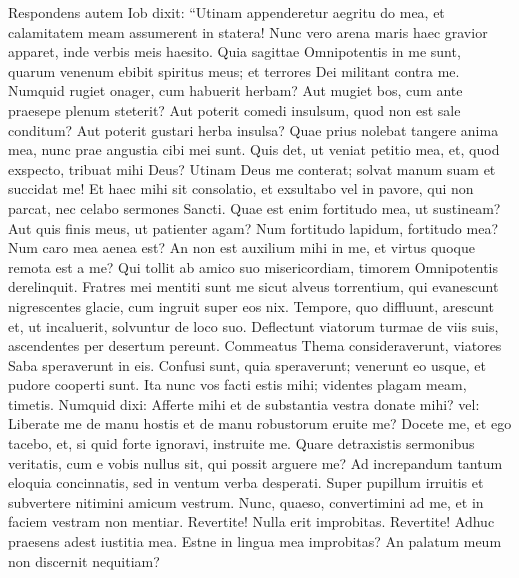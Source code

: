 \begin{biblechapter}  
\verse Respondens autem Iob dixit: 
\verse “Utinam appenderetur aegritu do mea, et calamitatem meam assumerent in statera! 
\verse Nunc vero arena maris haec gravior apparet, inde verbis meis haesito. 
\verse Quia sagittae Omnipotentis in me sunt, quarum venenum ebibit spiritus meus; et terrores Dei militant contra me. 
\verse Numquid rugiet onager, cum habuerit herbam? Aut mugiet bos, cum ante praesepe plenum steterit? 
\verse Aut poterit comedi insulsum, quod non est sale conditum? Aut poterit gustari herba insulsa? 
\verse Quae prius nolebat tangere anima mea, nunc prae angustia cibi mei sunt. 
\verse Quis det, ut veniat petitio mea, et, quod exspecto, tribuat mihi Deus? 
\verse Utinam Deus me conterat; solvat manum suam et succidat me! 
\verse Et haec mihi sit consolatio, et exsultabo vel in pavore, qui non parcat, nec celabo sermones Sancti. 
\verse Quae est enim fortitudo mea, ut sustineam? Aut quis finis meus, ut patienter agam? 
\verse Num fortitudo lapidum, fortitudo mea? Num caro mea aenea est? 
\verse An non est auxilium mihi in me, et virtus quoque remota est a me? 
\verse Qui tollit ab amico suo misericordiam, timorem Omnipotentis derelinquit. 
\verse Fratres mei mentiti sunt me sicut alveus torrentium, qui evanescunt 
\verse nigrescentes glacie, cum ingruit super eos nix. 
\verse Tempore, quo diffluunt, arescunt et, ut incaluerit, solvuntur de loco suo. 
\verse Deflectunt viatorum turmae de viis suis, ascendentes per desertum pereunt. 
\verse Commeatus Thema consideraverunt, viatores Saba speraverunt in eis. 
\verse Confusi sunt, quia speraverunt; venerunt eo usque, et pudore cooperti sunt. 
\verse Ita nunc vos facti estis mihi; videntes plagam meam, timetis. 
\verse Numquid dixi: Afferte mihi et de substantia vestra donate mihi? 
\verse vel: Liberate me de manu hostis et de manu robustorum eruite me? 
\verse Docete me, et ego tacebo, et, si quid forte ignoravi, instruite me. 
\verse Quare detraxistis sermonibus veritatis, cum e vobis nullus sit, qui possit arguere me? 
\verse Ad increpandum tantum eloquia concinnatis, sed in ventum verba desperati. 
\verse Super pupillum irruitis et subvertere nitimini amicum vestrum. 
\verse Nunc, quaeso, convertimini ad me, et in faciem vestram non mentiar. 
\verse Revertite! Nulla erit improbitas. Revertite! Adhuc praesens adest iustitia mea. 
\verse Estne in lingua mea improbitas? An palatum meum non discernit nequitiam? 
\end{biblechapter}

